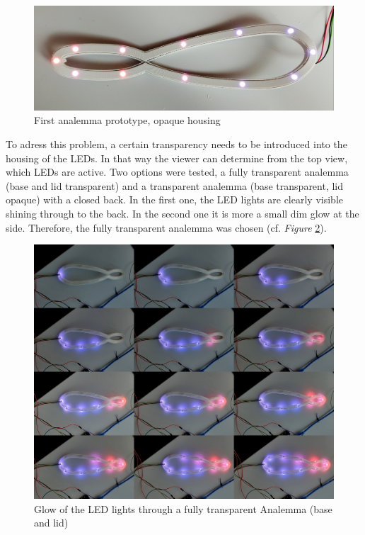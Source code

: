 \documentclass[a4paper,9pt]{article}
\begin{document}
    \begin{figure}[H]
        \centering
        \includegraphics[width=0.85\linewidth]{Images/lig.jpg}
        \caption{First analemma prototype, opaque housing}
        \label{lieing}
    \end{figure}
    \begin{multicols}{2}
  
    To adress this problem, a certain transparency needs to be introduced into the housing of the LEDs. In that way the viewer can determine from the top view, which LEDs are active. Two options were tested, a fully transparent analemma (base and lid transparent) and a transparent analemma (base transparent, lid opaque) with a closed back. In the first one, the LED lights are clearly visible shining through to the back. In the second one it is more a small dim glow at the side. Therefore, the fully transparent analemma was chosen (cf. \textit{Figure} \ref{ligtt}).
    \end{multicols}
    \begin{figure}[H]
        \centering
        \includegraphics[width=.9\linewidth]{Images/lights.jpg}
        \caption{Glow of the LED lights through a fully transparent Analemma (base and lid)}
        \label{ligtt}
    \end{figure}
\end{document}

